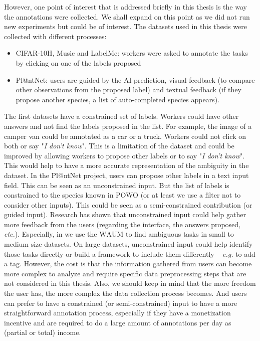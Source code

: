 However, one point of interest that is addressed briefly in this thesis is the way the annotations were collected. We shall expand on this point as we did not run new experiments but could be of interest.
The datasets used in this thesis were collected with different processes:
\begin{itemize}
    \item CIFAR-10H, Music and LabelMe: workers were asked to annotate the tasks by clicking on one of the labels proposed
    \item Pl@ntNet: users are guided by the AI prediction, visual feedback (to compare other observations from the proposed label) and textual feedback (if they propose another species, a list of auto-completed species appears).
\end{itemize}
The first datasets have a constrained set of labels. Workers could have other answers and not find the labels proposed in the list. For example, the image of a camper van could be annotated as a car or a truck. Workers could not click on both or say "\emph{I don't know}". This is a limitation of the dataset and could be improved by allowing workers to propose other labels or to say "\emph{I don't know}". This would help to have a more accurate representation of the ambiguity in the dataset. In the Pl@ntNet project, users can propose other labels in a text input field. This can be seen as an unconstrained input. But the list of labels is constrained to the species known in POWO (or at least we use a filter not to consider other inputs). This could be seen as a semi-constrained contribution (or guided input). Research \citep{chamberlain2020speaking,oppenlaender2020crowdui} has shown that unconstrained input could help gather more feedback from the users (regarding the interface, the answers proposed, \emph{etc.}). Especially, in  we use the $\mathrm{WAUM}$ to find ambiguous tasks in small to medium size datasets.
On large datasets, unconstrained input could help identify those tasks directly or build a framework to include them differently -- \emph{e.g.} to add a tag. However, the cost is that the information gathered from users can become more complex to analyze and require specific data preprocessing steps that are not considered in this thesis. Also, we should keep in mind that the more freedom the user has, the more complex the data collection process becomes. And users can prefer to have a constrained (or semi-constrained) input to have a more straightforward annotation process, especially if they have a monetization incentive and are required to do a large amount of annotations per day as (partial or total) income.

